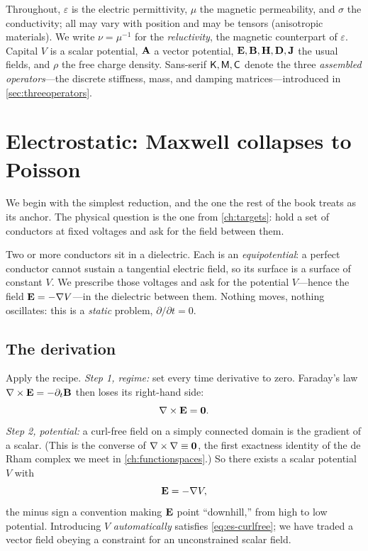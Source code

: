 \begin{notationbox}
Throughout, $\varepsilon$ is the electric permittivity, $\mu$ the magnetic
permeability, and $\sigma$ the conductivity; all may vary with position and may
be tensors (anisotropic materials). We write $\nu=\mu^{-1}$ for the
\emph{reluctivity}, the magnetic counterpart of $\varepsilon$. Capital
$V$ is a scalar potential, $\mathbf{A}$ a vector potential, $\mathbf{E},\mathbf{B},\mathbf{H},\mathbf{D},\mathbf{J}$ the
usual fields, and $\rho$ the free charge density. Sans-serif $\mathsf{K},\mathsf{M},\mathsf{C}$
denote the three \emph{assembled operators}---the discrete stiffness, mass, and
damping matrices---introduced in \cref{sec:threeoperators}.
\end{notationbox}

\section{Electrostatic: Maxwell collapses to Poisson}
\label{sec:electrostatic}

We begin with the simplest reduction, and the one the rest of the book treats as
its anchor. The physical question is the one from \cref{ch:targets}: hold a set
of conductors at fixed voltages and ask for the field between them.

\begin{physicsbox}
Two or more conductors sit in a dielectric. Each is an \emph{equipotential}: a
perfect conductor cannot sustain a tangential electric field, so its surface is
a surface of constant $V$. We prescribe those voltages and ask for the potential
$V$---hence the field $\mathbf{E}=-\nabla V$---in the dielectric between them. Nothing
moves, nothing oscillates: this is a \emph{static} problem,
$\partial/\partial t = 0$.
\end{physicsbox}

\subsection{The derivation}

Apply the recipe. \emph{Step 1, regime:} set every time derivative to zero.
Faraday's law $\nabla\times\mathbf{E} = -\partial_t\mathbf{B}$ then loses its right-hand side:
\begin{equation}
  \nabla\times\mathbf{E} = \mathbf{0}.
  \label{eq:es-curlfree}
\end{equation}
\emph{Step 2, potential:} a curl-free field on a simply connected domain is the
gradient of a scalar. (This is the converse of $\nabla\times\nabla\equiv\mathbf 0$, the
first exactness identity of the de Rham complex we meet in
\cref{ch:functionspaces}.) So there exists a scalar potential $V$ with
\begin{equation}
  \mathbf{E} = -\nabla V,
  \label{eq:es-potential}
\end{equation}
the minus sign a convention making $\mathbf{E}$ point ``downhill,'' from high to low
potential. Introducing $V$ \emph{automatically} satisfies
\cref{eq:es-curlfree}; we have traded a vector field obeying a constraint for an
unconstrained scalar field.

